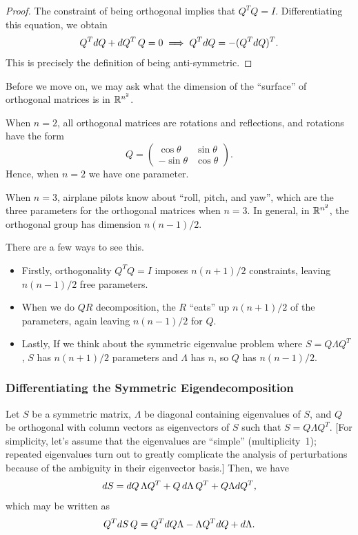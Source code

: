 \begin{proof}
    The constraint of being orthogonal implies that $Q^T Q = I$. Differentiating this equation, we obtain 
    \[
    Q^T d Q + d Q^T \, Q = 0 \implies Q^T d Q = - (Q^T d Q)^T.
    \]
    This is precisely the definition of being anti-symmetric.
\end{proof}

Before we move on, we may ask what the dimension of the ``surface'' of orthogonal matrices is in $\mathbb R^{n^2}$.

When $n = 2$, all orthogonal matrices are rotations and reflections, and rotations have the form 
\[
Q = \begin{pmatrix}
    \cos \theta & \sin \theta \\ 
    - \sin \theta & \cos \theta
\end{pmatrix}.
\]
Hence, when $n=2$ we have one parameter.

When $n = 3$, airplane pilots know about ``roll, pitch, and yaw'', which are the three parameters for the orthogonal matrices when $n =3.$ In general, in $\mathbb R^{n^2}$, the orthogonal group has dimension $n(n-1)/2$.

There are a few ways to see this.
\begin{itemize}
    \item Firstly, orthogonality $Q^T Q = I$ imposes $n(n+1)/2$ constraints, leaving $n(n-1)/2$ free parameters.
    \item When we do $QR$ decomposition, the $R$ ``eats'' up $n(n+1)/2$ of the parameters, again leaving $n(n-1)/2$ for $Q$.
    \item Lastly, If we think about the symmetric eigenvalue problem where $S = Q \Lambda Q^T$, $S$ has $n(n+1) /2$ parameters and $\Lambda$ has $n$, so $Q$ has $n(n-1)/2$.
\end{itemize}

\subsubsection{Differentiating the Symmetric Eigendecomposition}

Let $S$ be a symmetric matrix, $\Lambda$ be diagonal containing eigenvalues of $S$, and $Q$ be orthogonal with column vectors as eigenvectors of $S$ such that $S = Q \Lambda Q^T$.  [For simplicity, let's assume that the eigenvalues are ``simple'' (multiplicity~1); repeated eigenvalues turn out to greatly complicate the analysis of perturbations because of the ambiguity in their eigenvector basis.] Then, we have 
\[
d S = d Q \, \Lambda Q^T + Q \, d \Lambda \, Q^T + Q \Lambda d Q^T,
\]
which may be written as 
\[
Q^T d S \, Q = Q^T d Q \Lambda - \Lambda Q^T d Q + d \Lambda.
\]

